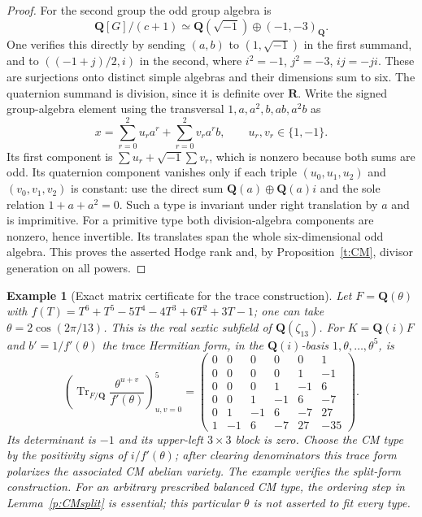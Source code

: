 \documentclass[10pt,reqno]{article}
\theoremstyle{emphasizedplain}
\theoremstyle{emphasizeddefinition}
\newtheorem{example}[theorem]{Example}
\theoremstyle{emphasizeddefinition}
\DeclareMathOperator{\Tr}{Tr}
\newcommand{\Q}{\mathbf Q}
\newcommand{\R}{\mathbf R}
\begin{document}
\begin{proof}
For the second group the odd group algebra is
\[
 \Q[G]/(c+1)\simeq\Q(\sqrt{-1})\oplus(-1,-3)_\Q.
\]
One verifies this directly by sending $(a,b)$ to $(1,\sqrt{-1})$
in the first summand, and to $((-1+j)/2,i)$ in the second, where
$i^2=-1$, $j^2=-3$, $ij=-ji$. These are surjections onto distinct
simple algebras and their dimensions sum to six. The quaternion
summand is division, since it is definite over $\R$.
Write the signed group-algebra element using the transversal
$1,a,a^2,b,ab,a^2b$ as
\[
 x=\sum_{r=0}^2u_ra^r+\sum_{r=0}^2v_ra^rb,
 \qquad u_r,v_r\in\{1,-1\}.
\]
Its first component is $\sum u_r+\sqrt{-1}\sum v_r$, which is
nonzero because both sums are odd. Its quaternion component vanishes
only if each triple $(u_0,u_1,u_2)$ and $(v_0,v_1,v_2)$ is constant:
use the direct sum $\Q(a)\oplus\Q(a)i$ and the sole relation
$1+a+a^2=0$. Such a type is invariant under right translation by
$a$ and is imprimitive. For a primitive type both division-algebra
components are nonzero, hence invertible. Its translates span the
whole six-dimensional odd algebra. This proves the asserted Hodge
rank and, by Proposition~\ref{t:CM}, divisor generation on all powers.
\end{proof}

\begin{example}[Exact matrix certificate for the trace construction]
Let $F=\Q(\theta)$ with
$f(T)=T^6+T^5-5T^4-4T^3+6T^2+3T-1$; one can take
$\theta=2\cos(2\pi/13)$. This is the real sextic subfield of
$\Q(\zeta_{13})$. For $K=\Q(i)F$ and $b'=1/f'(\theta)$ the trace
Hermitian form, in the $\Q(i)$-basis $1,\theta,\ldots,\theta^5$, is
\[
 \left(\Tr_{F/\Q}\frac{\theta^{u+v}}{f'(\theta)}\right)_{u,v=0}^5
 =\begin{pmatrix}
 0&0&0&0&0&1\\
 0&0&0&0&1&-1\\
 0&0&0&1&-1&6\\
 0&0&1&-1&6&-7\\
 0&1&-1&6&-7&27\\
 1&-1&6&-7&27&-35
 \end{pmatrix}.
\]
Its determinant is $-1$ and its upper-left $3\times3$ block is zero.
Choose the CM type by the positivity signs of $i/f'(\theta)$; after
clearing denominators this trace form polarizes the associated CM
abelian variety. The example verifies the split-form construction.
For an arbitrary prescribed balanced CM type, the ordering step in
Lemma~\ref{p:CMsplit} is essential; this particular $\theta$ is not
asserted to fit every type.
\end{example}
\end{document}
